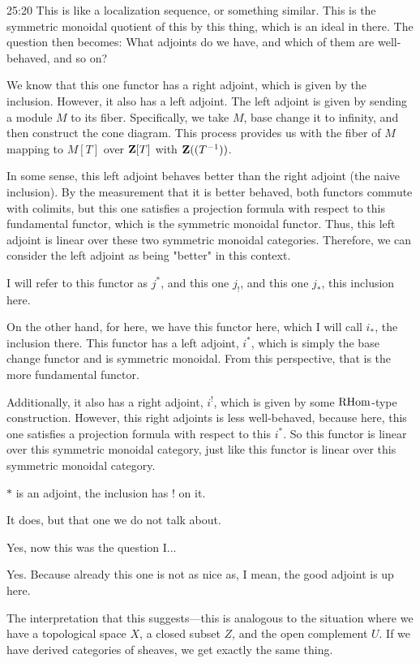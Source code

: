 \begin{unfinished}{25:20}
% 
This is like a localization sequence, or something similar. This is the symmetric monoidal quotient of this by this thing, which is an ideal in there. The question then becomes: What adjoints do we have, and which of them are well-behaved, and so on?

We know that this one functor  has a right adjoint, which is given by the inclusion. However, it also has a left adjoint. The left adjoint is given by sending a module $M$ to its fiber. Specifically, we take $M$, base change it to infinity, and then construct the cone diagram. This process provides us with the fiber of $M$ mapping to $M[T]$ over $\mathbf Z[T]$ with $\mathbf Z((T^{-1}))$.

In some sense, this left adjoint behaves better than the right adjoint (the naive inclusion). By the measurement that it is better behaved, both functors commute with colimits, but this one satisfies a projection formula with respect to this fundamental functor, which is the symmetric monoidal functor. Thus, this left adjoint is linear over these two symmetric monoidal categories. Therefore, we can consider the left adjoint as being "better" in this context.

I will refer to this functor as $j^\ast$, and this one $j_!$, and this one $j_\ast$, this inclusion here. 

On the other hand, for here, we have this functor here, which I will call $i_\ast$, the inclusion there. 
This functor has a left adjoint, $i^\ast$, which is simply the base change functor and is symmetric monoidal. From this perspective, that  is the more fundamental functor.

Additionally, it  also has a right adjoint, $i^!$, which is given by some $\operatorname{RHom}$-type construction. However, this right adjoints is less well-behaved, because here, this one satisfies a projection formula with respect to this $i^\ast$. So this functor is linear over this symmetric monoidal category, just like this functor is linear over this symmetric monoidal category.

$\ast$ is an adjoint, the inclusion has $!$ on it.


\ans It does, but that one we do not talk about.

\ques Yes, now this was the question I...


\ans Yes. Because already this one is not as nice as, I mean, the good adjoint is up here.

The interpretation that this suggests---this is analogous to the situation where we have a topological space $X$, a closed subset $Z$, and the open complement $U$. If we have derived categories of sheaves, we get exactly the same thing. 


\end{unfinished}
